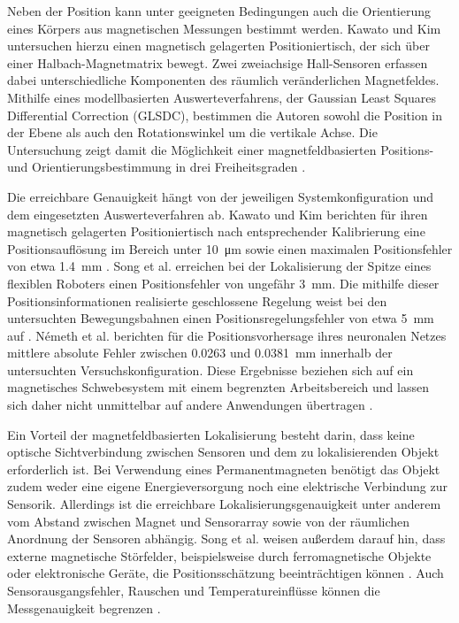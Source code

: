 Neben der Position kann unter geeigneten Bedingungen auch die Orientierung eines Körpers aus magnetischen Messungen bestimmt werden. Kawato und Kim untersuchen hierzu einen magnetisch gelagerten Positioniertisch, der sich über einer Halbach-Magnetmatrix bewegt. Zwei zweiachsige Hall-Sensoren erfassen dabei unterschiedliche Komponenten des räumlich veränderlichen Magnetfeldes. Mithilfe eines modellbasierten Auswerteverfahrens, der Gaussian Least Squares Differential Correction (GLSDC), bestimmen die Autoren sowohl die Position in der Ebene als auch den Rotationswinkel um die vertikale Achse. Die Untersuchung zeigt damit die Möglichkeit einer magnetfeldbasierten Positions- und Orientierungsbestimmung in drei Freiheitsgraden \cite{KawatoKim2005}.

Die erreichbare Genauigkeit hängt von der jeweiligen Systemkonfiguration und dem eingesetzten Auswerteverfahren ab. Kawato und Kim berichten für ihren magnetisch gelagerten Positioniertisch nach entsprechender Kalibrierung eine Positionsauflösung im Bereich unter \SI{10}{\micro\metre} sowie einen maximalen Positionsfehler von etwa \SI{1,4}{\milli\metre} \cite{KawatoKim2005}. Song et al. erreichen bei der Lokalisierung der Spitze eines flexiblen Roboters einen Positionsfehler von ungefähr \SI{3}{\milli\metre}. Die mithilfe dieser Positionsinformationen realisierte geschlossene Regelung weist bei den untersuchten Bewegungsbahnen einen Positionsregelungsfehler von etwa \SI{5}{\milli\metre} auf \cite{Song2026Magnetic}.
Németh et al. berichten für die Positionsvorhersage ihres neuronalen Netzes mittlere absolute Fehler zwischen \num{0,0263} und \SI{0,0381}{\milli\metre} innerhalb der untersuchten Versuchskonfiguration. Diese Ergebnisse beziehen sich auf ein magnetisches Schwebesystem mit einem begrenzten Arbeitsbereich und lassen sich daher nicht unmittelbar auf andere Anwendungen übertragen \cite{Nemeth2025Hall}.

Ein Vorteil der magnetfeldbasierten Lokalisierung besteht darin, dass keine optische Sichtverbindung zwischen Sensoren und dem zu lokalisierenden Objekt erforderlich ist. Bei Verwendung eines Permanentmagneten benötigt das Objekt zudem weder eine eigene Energieversorgung noch eine elektrische Verbindung zur Sensorik. Allerdings ist die erreichbare Lokalisierungsgenauigkeit unter anderem vom Abstand zwischen Magnet und Sensorarray sowie von der räumlichen Anordnung der Sensoren abhängig. Song et al. weisen außerdem darauf hin, dass externe magnetische Störfelder, beispielsweise durch ferromagnetische Objekte oder elektronische Geräte, die Positionsschätzung beeinträchtigen können \cite{Song2026Magnetic}. 
Auch Sensorausgangsfehler, Rauschen und Temperatureinflüsse können die Messgenauigkeit begrenzen \cite{KawatoKim2005}.

